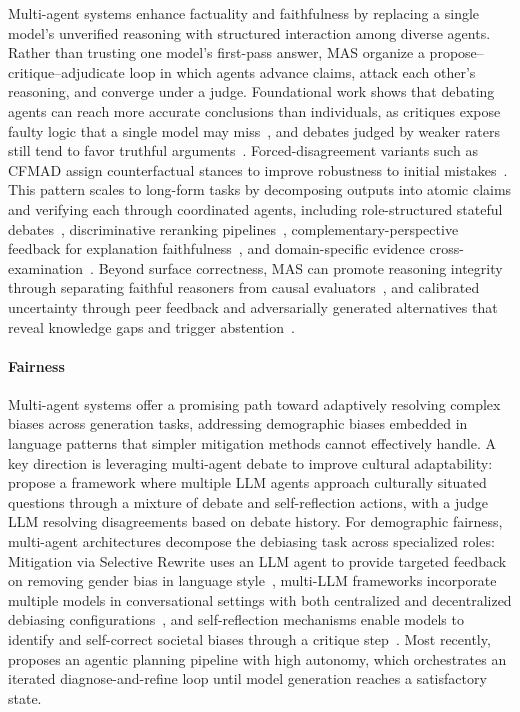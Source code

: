 Multi-agent systems enhance factuality and faithfulness by replacing a single model's unverified reasoning with structured interaction among diverse agents. Rather than trusting one model's first-pass answer, MAS organize a propose--critique--adjudicate loop in which agents advance claims, attack each other's reasoning, and converge under a judge. Foundational work shows that debating agents can reach more accurate conclusions than individuals, as critiques expose faulty logic that a single model may miss~\citep{10.5555/3692070.3692537}, and debates judged by weaker raters still tend to favor truthful arguments~\citep{10.5555/3692070.3693020}. Forced-disagreement variants such as CFMAD assign counterfactual stances to improve robustness to initial mistakes~\citep{conf/coling/0008L0HF25}. This pattern scales to long-form tasks by decomposing outputs into atomic claims and verifying each through coordinated agents, including role-structured stateful debates~\citep{10889448}, discriminative reranking pipelines~\citep{wan-etal-2025-mamm}, complementary-perspective feedback for explanation faithfulness~\citep{kim2024llmsproducefaithfulexplanations}, and domain-specific evidence cross-examination~\citep{song2024auditllmmultiagentcollaborationlogbased}. Beyond surface correctness, MAS can promote reasoning integrity through separating faithful reasoners from causal evaluators~\citep{tang2025causalgptmultiagentapproachfaithful}, and calibrated uncertainty through peer feedback and adversarially generated alternatives that reveal knowledge gaps and trigger abstention~\citep{feng-etal-2024-dont, yang2024confidencecalibrationrationalizationllms}.

\paragraph{Fairness}
Multi-agent systems offer a promising path toward adaptively resolving complex biases across generation tasks, addressing demographic biases embedded in language patterns that simpler mitigation methods cannot effectively handle. A key direction is leveraging multi-agent debate to improve cultural adaptability:~\citet{ki-etal-2025-multiple} propose a framework where multiple LLM agents approach culturally situated questions through a mixture of debate and self-reflection actions, with a judge LLM resolving disagreements based on debate history. For demographic fairness, multi-agent architectures decompose the debiasing task across specialized roles: Mitigation via Selective Rewrite uses an LLM agent to provide targeted feedback on removing gender bias in language style~\citep{wan-chang-2025-white}, multi-LLM frameworks incorporate multiple models in conversational settings with both centralized and decentralized debiasing configurations~\citep{owens2024multi}, and self-reflection mechanisms enable models to identify and self-correct societal biases through a critique step~\citep{borah-mihalcea-2024-towards}.
Most recently, ~\citet{wan2025culturallensmodelsadopt} proposes an agentic planning pipeline with high autonomy, which orchestrates an iterated diagnose-and-refine loop until model generation reaches a satisfactory state.

